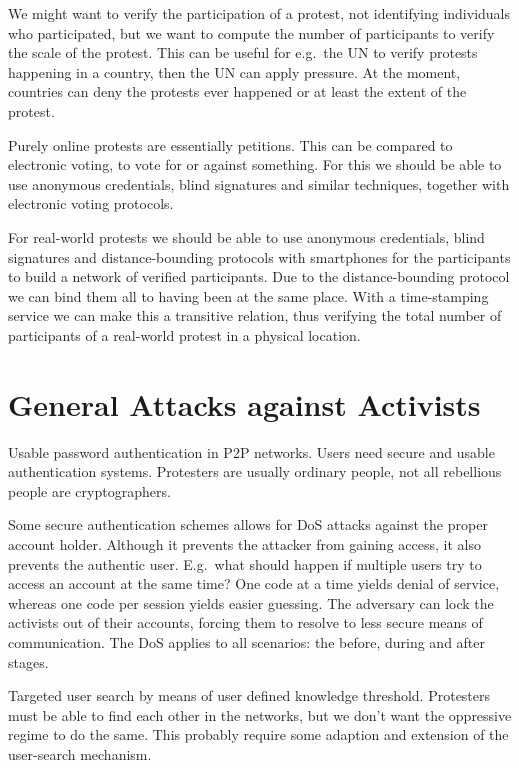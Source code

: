 \documentclass[a4paper]{llncs}
\begin{document}
We might want to verify the participation of a protest, not identifying 
individuals who participated, but we want to compute the number of participants 
to verify the scale of the protest.
This can be useful for e.g.\ the UN to verify protests happening in a country, 
then the UN can apply pressure.
At the moment, countries can deny the protests ever happened or at least the 
extent of the protest.

Purely online protests are essentially petitions.
This can be compared to electronic voting, to vote for or against something.
For this we should be able to use anonymous credentials, blind signatures and 
similar techniques, together with electronic voting protocols.

For real-world protests we should be able to use anonymous credentials, blind 
signatures and distance-bounding protocols with smartphones for the 
participants to build a network of verified participants.
Due to the distance-bounding protocol we can bind them all to having been at 
the same place.
With a time-stamping service we can make this a transitive relation, thus 
verifying the total number of participants of a real-world protest in 
a physical location.


\section{General Attacks against Activists}

Usable password authentication in \ac{P2P} networks.
Users need secure and usable authentication systems.
Protesters are usually ordinary people, not all rebellious people are 
cryptographers.

Some secure authentication schemes allows for \ac{DoS} attacks against the 
proper account holder.
Although it prevents the attacker from gaining access, it also prevents the 
authentic user.
E.g.\ what should happen if multiple users try to access an account at the same 
time?
One code at a time yields denial of service, whereas one code per session 
yields easier guessing.
The adversary can lock the activists out of their accounts, forcing them to 
resolve to less secure means of communication.
The \ac{DoS} applies to all scenarios: the before, during and after stages.

Targeted user search by means of user defined knowledge threshold.
Protesters must be able to find each other in the networks, but we don't want 
the oppressive regime to do the same.
This probably require some adaption and extension of the user-search mechanism.


\printbibliography{}
\end{document}

